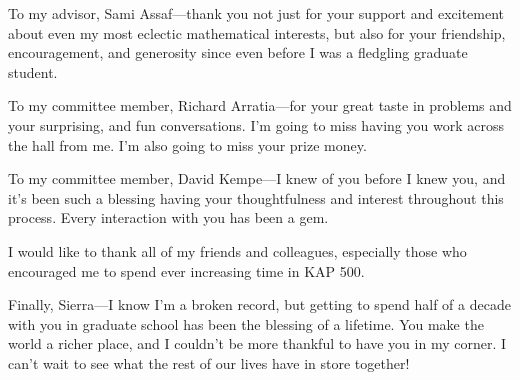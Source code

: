 To my advisor, Sami Assaf---thank you not just for your support and
excitement about even my most eclectic mathematical interests,
but also for your friendship, encouragement, and generosity
since even before I was a fledgling graduate student.

To my committee member, Richard Arratia---for your great taste
in problems and your surprising, and fun conversations. I'm going to miss having
you work across the hall from me. I'm also going to miss your prize money.

To my committee member, David Kempe---I knew of you before I knew you, and it's been
such a blessing having your thoughtfulness and interest throughout this process.
Every interaction with you has been a gem.

I would like to thank all of my friends and colleagues,
especially those who encouraged me to spend ever increasing time in KAP 500.

Finally, Sierra---I know I'm a broken record, but getting to spend half of a
decade with you in graduate school has been the blessing of a lifetime.
You make the world a richer place, and I couldn't be more thankful to have you
in my corner.
I can't wait to see what the rest of our lives have in store together!
